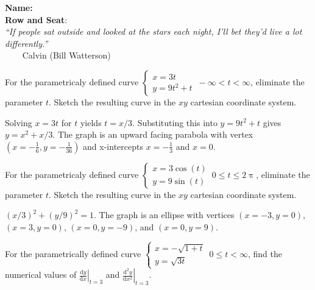 \documentclass[12pt,fleqn,answers]{exam}
\newcommand{\class}{MATH 202, Spring \the\year}
\begin{document}
\large
\noindent\makebox[3.0truein][l]{\textbf{\class}}
\textbf{Name:} \hrulefill \\
\noindent {}
\textbf{Row and Seat}:\hrulefill\\





\noindent \emph{“If people sat outside and looked at 
the stars each night, I’ll bet they’d live a lot differently.”}\\
  $\phantom{xxx}$ \hfill {\sc Calvin (Bill Watterson)}


\begin{questions} 
    
  
\question For the parametricaly defined curve $\begin{cases}
      x = 3 t \\ y = 9 t^2 + t \end{cases} \, -\infty < t < \infty$,
      eliminate the parameter $t$. Sketch the resulting curve in
      the $xy$ cartesian coordinate system.

\begin{solution}[2.5in] Solving $  x = 3 t$ for $t$ yields $t = x/3$.
  Substituting this into  \mbox{$y = 9 t^2 + t$} gives $y = x^2 + x / 3$.
  The graph is an upward facing parabola with vertex \\
  \mbox{$(x=-\frac{1}{6}, y=-\frac{1}{36})$}
  and x-intercepts $x=-\frac{1}{3}$ and $x=0$.
\end{solution}

\question For the parametricaly defined curve $\begin{cases}
    x = 3 \cos(t) \\ y = 9 \sin(t) \end{cases} \, 0 \leq  t \leq 2 \uppi$,
    eliminate the parameter $t$. Sketch the resulting curve in
    the $xy$ cartesian coordinate system.

\begin{solution}[2.5in]
  $(x/3)^2 + (y/9)^2 = 1$.  The graph is an ellipse with
  vertices $(x=-3,y=0)$,$(x=3,y=0)$, $(x=0,y=-9)$, and $(x=0,y=9)$.
\end{solution}



\question For the parametrically defined curve 
$\displaystyle \begin{cases} x = -\sqrt{1+t} \\ y = \sqrt{3t} 
\end{cases} \, 0 \leq t < \infty$, find the numerical values 
of $\left . \frac{\mathrm{d} y}{\mathrm{d}x} \right |_{t=3}$
and $\left . \frac{\mathrm{d}^2 y}{\mathrm{d} x^2} \right |_{t=3}$.


\end{questions}
\end{document}
